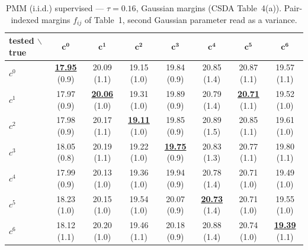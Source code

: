 \begin{table}[htbp]
  \centering
  \small
  \setlength{\tabcolsep}{4pt}
  \caption{PMM (i.i.d.) supervised — $\tau = 0.16$, Gaussian margins (CSDA Table~4(a)). Pair-indexed margins $f_{ij}$ of Table~1, second Gaussian parameter read as a variance.}
  \label{tab:exp2-low_tau_gauss}
  \begin{tabular}{lccccccc}
    \toprule
    tested $\backslash$ true & $\mathbf{c^{0}}$ & $\mathbf{c^{1}}$ & $\mathbf{c^{2}}$ & $\mathbf{c^{3}}$ & $\mathbf{c^{4}}$ & $\mathbf{c^{5}}$ & $\mathbf{c^{6}}$ \\
    \midrule
    $c^{0}$ & \textbf{\underline{17.95}} (0.9) & 20.09 (1.1) & 19.15 (1.0) & 19.84 (0.9) & 20.85 (1.4) & 20.87 (1.1) & 19.57 (1.1) \\
    $c^{1}$ & 17.97 (0.9) & \textbf{\underline{20.06}} (1.0) & 19.31 (1.0) & 19.89 (0.9) & 20.79 (1.4) & \textbf{\underline{20.71}} (1.1) & 19.52 (1.0) \\
    $c^{2}$ & 17.98 (0.9) & 20.17 (1.1) & \textbf{\underline{19.11}} (1.0) & 19.85 (0.9) & 20.89 (1.5) & 20.85 (1.1) & 19.61 (1.0) \\
    $c^{3}$ & 18.05 (0.8) & 20.19 (1.1) & 19.22 (1.0) & \textbf{\underline{19.75}} (0.9) & 20.83 (1.3) & 20.77 (1.1) & 19.80 (1.1) \\
    $c^{4}$ & 17.99 (0.9) & 20.13 (1.0) & 19.36 (1.0) & 19.94 (0.9) & 20.78 (1.4) & 20.71 (1.0) & 19.49 (1.0) \\
    $c^{5}$ & 18.23 (1.0) & 20.15 (1.0) & 19.54 (1.0) & 20.07 (0.9) & \textbf{\underline{20.73}} (1.4) & 20.71 (1.0) & 19.55 (1.0) \\
    $c^{6}$ & 18.12 (1.1) & 20.20 (1.0) & 19.46 (1.1) & 20.18 (0.9) & 20.88 (1.4) & 20.74 (1.0) & \textbf{\underline{19.39}} (1.1) \\
    \bottomrule
  \end{tabular}
\end{table}
